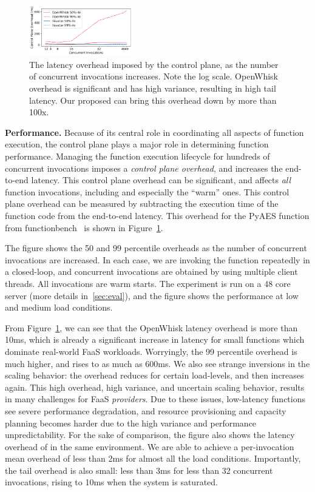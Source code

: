 \begin{figure}
  \centering  \includegraphics[width=0.4\textwidth]{../graphs/scaling/pyaes/openwhisk-overhead-scaling.pdf}
  \caption{The latency overhead imposed by the control plane, as the number of concurrent invocations increases. Note the log scale. OpenWhisk overhead is significant and has high variance, resulting in high tail latency. Our proposed \sysname can bring this overhead down by more than 100x. }
  \label{fig:ow-scaling}
\end{figure}


\noindent \textbf{Performance.}
%
Because of its central role in coordinating all aspects of function execution, the control plane plays a major role in determining function performance.
Managing the function execution lifecycle for hundreds of concurrent invocations imposes a \emph{control plane overhead}, and increases the end-to-end latency.
This control plane overhead can be significant, and affects \emph{all} function invocations, including and especially the ``warm'' ones. 
This control plane overhead can be measured by subtracting the execution time of the function code from the end-to-end latency.
This overhead for the PyAES function from functionbench~\cite{} is shown in Figure~\ref{fig:ow-scaling}. 

The figure shows the 50 and 99 percentile overheads as the number of concurrent invocations are increased.
In each case, we are invoking the function repeatedly in a closed-loop, and concurrent invocations are obtained by using multiple client threads. All invocations are warm starts.  
The experiment is run on a 48 core server (more details in~\ref{sec:eval}), and the figure shows the performance at low and medium load conditions. 

From Figure~\ref{fig:ow-scaling}, we can see that the OpenWhisk latency overhead is more than 10ms,  which is already a significant increase in latency for small functions which dominate real-world FaaS workloads.
Worryingly, the 99 percentile overhead is much higher, and rises to as much as 600ms.
We also see strange inversions in the scaling behavior: the overhead reduces for certain load-levels, and then increases again.
This high overhead, high variance, and uncertain scaling behavior, results in many challenges for FaaS \emph{providers}. 
Due to these issues, low-latency functions see severe performance degradation, and resource provisioning and capacity planning becomes harder due to the high variance and performance unpredictability.
For the sake of comparison, the figure also shows the latency overhead of \sysname in the same environment.
We are able to achieve a per-invocation mean overhead of less than 2ms for almost all the load conditions.
Importantly, the tail overhead is also small: less than 3ms for less than 32 concurrent invocations, rising to 10ms when the system is saturated. 


